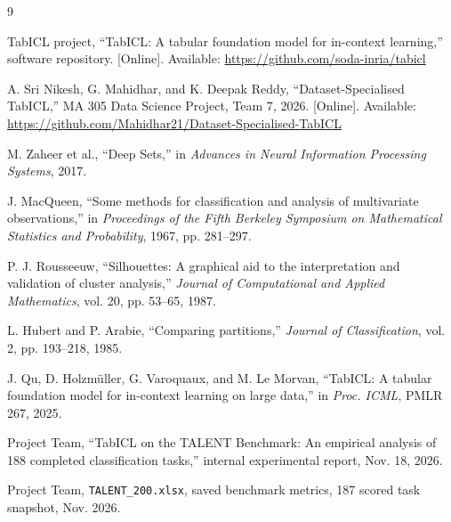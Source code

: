 \documentclass[conference]{IEEEtran}
\begin{document}
\begin{thebibliography}{9}

TabICL project, ``TabICL: A tabular foundation model for in-context learning,'' software repository. [Online]. Available: \url{https://github.com/soda-inria/tabicl}

A. Sri Nikesh, G. Mahidhar, and K. Deepak Reddy,
``Dataset-Specialised TabICL,''
MA 305 Data Science Project, Team 7, 2026.
[Online]. Available:
\url{https://github.com/Mahidhar21/Dataset-Specialised-TabICL}

M. Zaheer et al.,
``Deep Sets,''
in \emph{Advances in Neural Information Processing Systems},
2017.

J. MacQueen,
``Some methods for classification and analysis of multivariate observations,''
in \emph{Proceedings of the Fifth Berkeley Symposium on Mathematical Statistics and Probability},
1967, pp. 281--297.

P. J. Rousseeuw,
``Silhouettes: A graphical aid to the interpretation and validation of cluster analysis,''
\emph{Journal of Computational and Applied Mathematics},
vol. 20, pp. 53--65, 1987.

L. Hubert and P. Arabie,
``Comparing partitions,''
\emph{Journal of Classification},
vol. 2, pp. 193--218, 1985.

J. Qu, D. Holzm\"uller, G. Varoquaux, and M. Le Morvan, ``TabICL: A tabular foundation model for in-context learning on large data,'' in \emph{Proc. ICML}, PMLR 267, 2025.

Project Team, ``TabICL on the TALENT Benchmark: An empirical analysis of 188 completed classification tasks,'' internal experimental report, Nov. 18, 2026.

Project Team, \texttt{TALENT\_200.xlsx}, saved benchmark metrics, 187 scored task snapshot, Nov. 2026.

\end{thebibliography}
\end{document}
